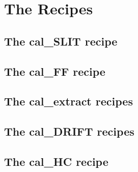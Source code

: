 \chapter{The Recipes}
\label{ch:the_recipes}












\clearpage
\newpage
\section{The cal\_SLIT recipe}
\label{ch:the_recipes:cal_SLIT_spirou}


\clearpage
\newpage
\section{The cal\_FF recipe}
\label{ch:the_recipes:cal_FF_RAW_spirou}


\clearpage
\newpage
\section{The cal\_extract recipes}
\label{ch:the_recipes:cal_extract_RAW_spirou}


\clearpage
\newpage
\section{The cal\_DRIFT recipes}
\label{ch:the_recipes:cal_DRIFT_RAW_spirou}



\clearpage
\newpage
\section{The cal\_HC recipe}
\label{ch:the_recipes:cal_HC_E2DS_spirou}



